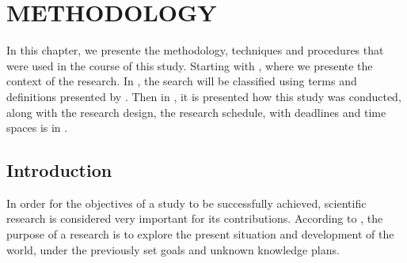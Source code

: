 \chapter{METHODOLOGY}\label{methodology}


In this chapter, we presente the methodology, techniques and procedures that were used in the course of this study. 
Starting with , where we presente the context of the research. 
In , the search will be classified using terms and definitions presented by \textcite{Prodanov:2013}. 
Then in , it is presented how this study was conducted, along with the research design, the research schedule, with deadlines and time spaces is in .

\section{Introduction}\label{sec:met-intro}


In order for the objectives of a study to be successfully achieved, scientific research is considered very important for its contributions. 
According to \cite{pingping_yulan_2013}, the purpose of a research is to explore the present situation and development of the world, under the previously set goals and unknown knowledge plans.

